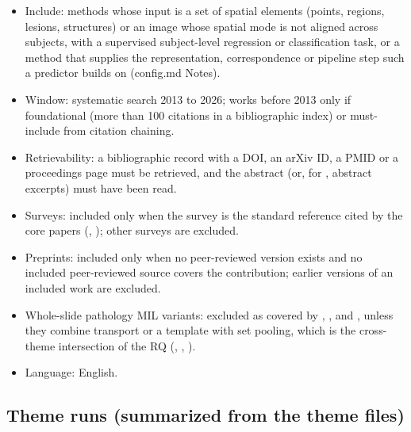\documentclass[journal,onecolumn]{IEEEtran}
\begin{document}
\begin{itemize}

\item{} Include: methods whose input is a set of spatial elements (points, regions, lesions, structures) or an image whose spatial mode is not aligned across subjects, with a supervised subject-level regression or classification task, or a method that supplies the representation, correspondence or pipeline step such a predictor builds on (config.md Notes).

\item{} Window: systematic search 2013 to 2026; works before 2013 only if foundational (more than 100 citations in a bibliographic index) or must-include from citation chaining.

\item{} Retrievability: a bibliographic record with a DOI, an arXiv ID, a PMID or a proceedings page must be retrieved, and the abstract (or, for \cite{Beg2005Computing}, abstract excerpts) must have been read.

\item{} Surveys: included only when the survey is the standard reference cited by the core papers (\cite{Kolda2009Tensor}, \cite{Peyre2019Computational}); other surveys are excluded.

\item{} Preprints: included only when no peer-reviewed version exists and no included peer-reviewed source covers the contribution; earlier versions of an included work are excluded.

\item{} Whole-slide pathology MIL variants: excluded as covered by \cite{Campanella2019Clinical}, \cite{Lu2021CLAM}, \cite{Shao2021TransMIL} and \cite{Ilse2018AttentionMIL}, unless they combine transport or a template with set pooling, which is the cross-theme intersection of the RQ (\cite{Ren2025OTSurv}, \cite{Xu2023Multimodal}, \cite{Song2024Multimodal}).

\item{} Language: English.

\end{itemize}

\subsection{Theme runs (summarized from the theme files)}
\end{document}
